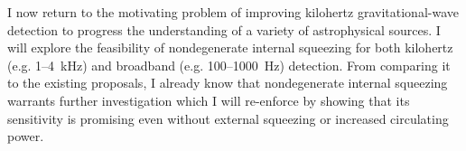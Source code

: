 I now return to the motivating problem of improving kilohertz gravitational-wave detection to progress the understanding of a variety of astrophysical sources. I will explore the feasibility of nondegenerate internal squeezing for both kilohertz (e.g. 1--4~kHz) and broadband (e.g. 100--1000~Hz) detection. From comparing it to the existing proposals, I already know that nondegenerate internal squeezing warrants further investigation which I will re-enforce by showing that its sensitivity is promising even without external squeezing or increased circulating power.










